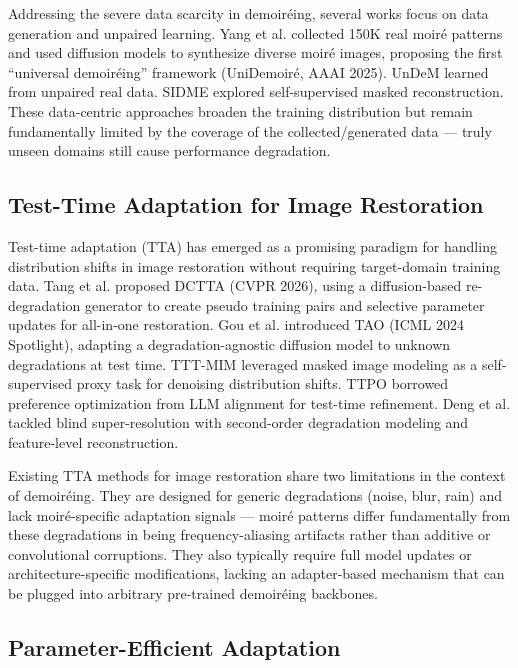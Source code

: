 \documentclass[10pt,twocolumn,letterpaper]{article}
\begin{document}
Addressing the severe data scarcity in demoir\'{e}ing, several works focus on data generation and unpaired learning. Yang et al. \cite{yang2025unidemoire} collected 150K real moir\'{e} patterns and used diffusion models to synthesize diverse moir\'{e} images, proposing the first ``universal demoir\'{e}ing'' framework (UniDemoir\'{e}, AAAI 2025). UnDeM \cite{anonymous2024undem} learned from unpaired real data. SIDME \cite{anonymous2025sidme} explored self-supervised masked reconstruction. These data-centric approaches broaden the training distribution but remain fundamentally limited by the coverage of the collected/generated data --- truly unseen domains still cause performance degradation.

\subsection{Test-Time Adaptation for Image Restoration}

Test-time adaptation (TTA) has emerged as a promising paradigm for handling distribution shifts in image restoration without requiring target-domain training data. Tang et al. \cite{tang2026degradation} proposed DCTTA (CVPR 2026), using a diffusion-based re-degradation generator to create pseudo training pairs and selective parameter updates for all-in-one restoration. Gou et al. \cite{gou2024testtime} introduced TAO (ICML 2024 Spotlight), adapting a degradation-agnostic diffusion model to unknown degradations at test time. TTT-MIM \cite{mansour2024tttmim} leveraged masked image modeling as a self-supervised proxy task for denoising distribution shifts. TTPO \cite{li2026testtime} borrowed preference optimization from LLM alignment for test-time refinement. Deng et al. \cite{deng2023efficient} tackled blind super-resolution with second-order degradation modeling and feature-level reconstruction.

Existing TTA methods for image restoration share two limitations in the context of demoir\'{e}ing. They are designed for generic degradations (noise, blur, rain) and lack moir\'{e}-specific adaptation signals --- moir\'{e} patterns differ fundamentally from these degradations in being frequency-aliasing artifacts rather than additive or convolutional corruptions. They also typically require full model updates or architecture-specific modifications, lacking an adapter-based mechanism that can be plugged into arbitrary pre-trained demoir\'{e}ing backbones.

\subsection{Parameter-Efficient Adaptation}
\end{document}
